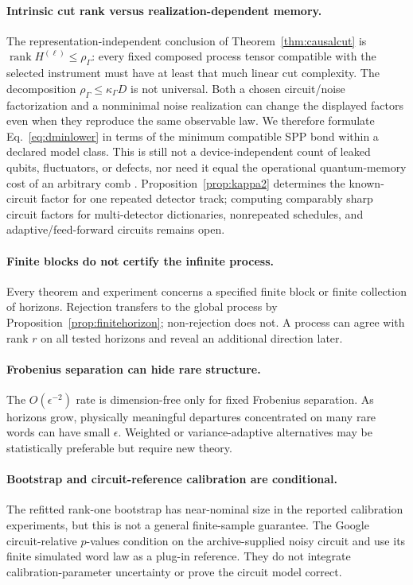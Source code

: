 \documentclass[11pt]{article}
\newcommand{\rank}{\operatorname{rank}}
\begin{document}
\paragraph{Intrinsic cut rank versus realization-dependent memory.}
The representation-independent conclusion of Theorem~\ref{thm:causalcut} is $\rank H^{(\ell)}\le\rho_\Gamma$: every fixed composed process tensor compatible with the selected instrument must have at least that much linear cut complexity. The decomposition $\rho_\Gamma\le\kappa_\Gamma D$ is not universal. Both a chosen circuit/noise factorization and a nonminimal noise realization can change the displayed factors even when they reproduce the same observable law. We therefore formulate Eq.~\eqref{eq:dminlower} in terms of the minimum compatible SPP bond within a declared model class. This is still not a device-independent count of leaked qubits, fluctuators, or defects, nor need it equal the operational quantum-memory cost of an arbitrary comb \cite{bisio2011memory,guo2022memory}. Proposition~\ref{prop:kappa2} determines the known-circuit factor for one repeated detector track; computing comparably sharp circuit factors for multi-detector dictionaries, nonrepeated schedules, and adaptive/feed-forward circuits remains open.

\paragraph{Finite blocks do not certify the infinite process.}
Every theorem and experiment concerns a specified finite block or finite collection of horizons. Rejection transfers to the global process by Proposition~\ref{prop:finitehorizon}; non-rejection does not. A process can agree with rank $r$ on all tested horizons and reveal an additional direction later.

\paragraph{Frobenius separation can hide rare structure.}
The $O(\epsilon^{-2})$ rate is dimension-free only for fixed Frobenius separation. As horizons grow, physically meaningful departures concentrated on many rare words can have small $\epsilon$. Weighted or variance-adaptive alternatives may be statistically preferable but require new theory.

\paragraph{Bootstrap and circuit-reference calibration are conditional.}
The refitted rank-one bootstrap has near-nominal size in the reported calibration experiments, but this is not a general finite-sample guarantee. The Google circuit-relative $p$-values condition on the archive-supplied noisy circuit and use its finite simulated word law as a plug-in reference. They do not integrate calibration-parameter uncertainty or prove the circuit model correct.
\end{document}
